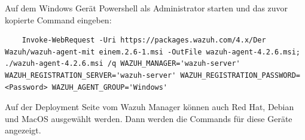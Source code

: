 Auf dem Windows Gerät Powershell als Administrator starten und das zuvor kopierte Command eingeben:

\begin{lstlisting}
    Invoke-WebRequest -Uri https://packages.wazuh.com/4.x/Der Wazuh/wazuh-agent-mit einem.2.6-1.msi -OutFile wazuh-agent-4.2.6.msi; ./wazuh-agent-4.2.6.msi /q WAZUH_MANAGER='wazuh-server' WAZUH_REGISTRATION_SERVER='wazuh-server' WAZUH_REGISTRATION_PASSWORD=<Password> WAZUH_AGENT_GROUP='Windows' 
\end{lstlisting}

Auf der Deployment Seite vom Wazuh Manager können auch Red Hat, Debian und MacOS ausgewählt werden.
Dann werden die Commands für diese Geräte angezeigt.